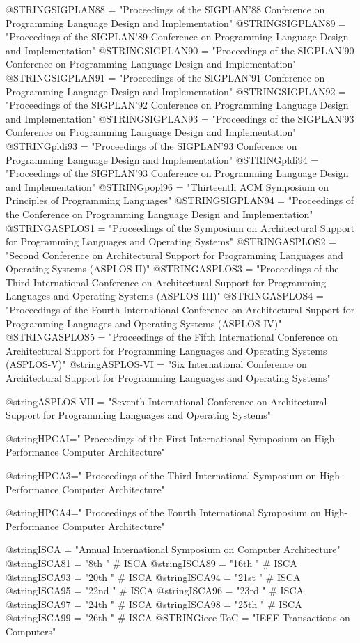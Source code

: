 @STRING{SIGPLAN88 = "Proceedings of the SIGPLAN'88 Conference on Programming Language Design and Implementation"}
@STRING{SIGPLAN89 = "Proceedings of the SIGPLAN'89 Conference on Programming Language Design and Implementation"}
@STRING{SIGPLAN90 = "Proceedings of the SIGPLAN'90 Conference on Programming Language Design and Implementation"}
@STRING{SIGPLAN91 = "Proceedings of the SIGPLAN'91 Conference on Programming Language Design and Implementation"}
@STRING{SIGPLAN92 = "Proceedings of the SIGPLAN'92 Conference on Programming Language Design and Implementation"}
@STRING{SIGPLAN93 = "Proceedings of the SIGPLAN'93 Conference on Programming Language Design and Implementation"}
@STRING{pldi93 = "Proceedings of the SIGPLAN'93 Conference on Programming Language Design and Implementation"}
@STRING{pldi94 = "Proceedings of the SIGPLAN'93 Conference on Programming Language Design and Implementation"}
@STRING{popl96 = "Thirteenth ACM Symposium on Principles of Programming Languages"}
@STRING{SIGPLAN94 = "Proceedings of the Conference on Programming Language Design and Implementation"}
@STRING{ASPLOS1 = "Proceedings of the Symposium on Architectural Support for Programming Languages and Operating Systems"}
@STRING{ASPLOS2 = "Second Conference on Architectural Support for Programming Languages and Operating Systems (ASPLOS II)"}
@STRING{ASPLOS3 = "Proceedings of the Third International Conference on Architectural Support for Programming Languages and Operating Systems (ASPLOS III)"}
@STRING{ASPLOS4 = "Proceedings of the Fourth International Conference on Architectural Support for Programming Languages and Operating Systems (ASPLOS-IV)"}
@STRING{ASPLOS5 = "Proceedings of the Fifth International Conference on Architectural Support for Programming Languages and Operating Systems (ASPLOS-V)"}
@string{ASPLOS-VI = "Six International Conference on Architectural Support for Programming Languages and Operating Systems"}

@string{ASPLOS-VII = "Seventh International Conference on Architectural Support for Programming Languages and Operating Systems"}


@string{HPCAI="	Proceedings of the First International Symposium on
High-Performance Computer Architecture"}

@string{HPCA3="	Proceedings of the Third International Symposium on
High-Performance Computer Architecture"}

@string{HPCA4="	Proceedings of the Fourth International Symposium on
High-Performance Computer Architecture"}

@string{ISCA = "Annual International Symposium on Computer Architecture"}
@string{ISCA81 = "8th " # ISCA}
@string{ISCA89 = "16th " # ISCA}
@string{ISCA93 = "20th " # ISCA}
@string{ISCA94 = "21st " # ISCA}
@string{ISCA95 = "22nd " # ISCA}
@string{ISCA96 = "23rd " # ISCA}
@string{ISCA97 = "24th " # ISCA}
@string{ISCA98 = "25th " # ISCA}
@string{ISCA99 = "26th " # ISCA}
@STRING{ieee-ToC = "IEEE Transactions on Computers"}

